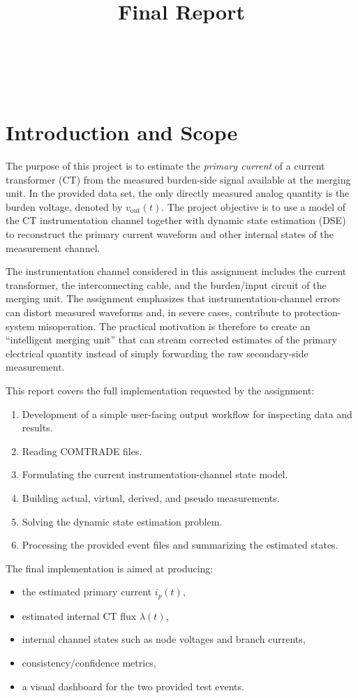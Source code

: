 \documentclass[11pt]{article}
\title{\projecttitle \\[0.4em] \large Final Report}
\author{\studentname \\ \partnername \\ \coursename \\ \sectionname}
\date{\submissiondate}
\begin{document}
\maketitle
\tableofcontents
\newpage

\section{Introduction and Scope}
The purpose of this project is to estimate the \emph{primary current} of a current transformer (CT)
from the measured burden-side signal available at the merging unit. In the provided data set, the
only directly measured analog quantity is the burden voltage, denoted by $v_{\text{out}}(t)$. The
project objective is to use a model of the CT instrumentation channel together with dynamic state
estimation (DSE) to reconstruct the primary current waveform and other internal states of the
measurement channel.

The instrumentation channel considered in this assignment includes the current transformer, the
interconnecting cable, and the burden/input circuit of the merging unit. The assignment emphasizes
that instrumentation-channel errors can distort measured waveforms and, in severe cases, contribute
to protection-system misoperation. The practical motivation is therefore to create an
``intelligent merging unit'' that can stream corrected estimates of the primary electrical quantity
instead of simply forwarding the raw secondary-side measurement.

This report covers the full implementation requested by the assignment:
\begin{enumerate}[label=\textbf{Task \arabic*:}, leftmargin=1.25in]
  \item Development of a simple user-facing output workflow for inspecting data and results.
  \item Reading COMTRADE files.
  \item Formulating the current instrumentation-channel state model.
  \item Building actual, virtual, derived, and pseudo measurements.
  \item Solving the dynamic state estimation problem.
  \item Processing the provided event files and summarizing the estimated states.
\end{enumerate}

The final implementation is aimed at producing:
\begin{itemize}
  \item the estimated primary current $i_p(t)$,
  \item estimated internal CT flux $\lambda(t)$,
  \item internal channel states such as node voltages and branch currents,
  \item consistency/confidence metrics,
  \item a visual dashboard for the two provided test events.
\end{itemize}
\end{document}

